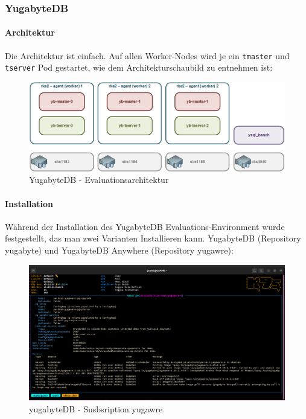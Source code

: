 
\clearpage
\begin{flushleft}
    \subsubsection{YugabyteDB}
    \paragraph{Architektur}
    Die Architektur ist einfach.
    Auf allen Worker-Nodes wird je ein \texttt{tmaster} und \texttt{tserver} Pod gestartet,
    wie dem Architekturschaubild zu entnehmen ist:
    \begin{figure}[H]
        \centering
        \includegraphics[width=0.8\linewidth]{source/implementation/evaluation/postgresql_ha_solutions/yugabytedb/yugabytedb-evaluation-architecture}
        \caption{YugabyteDB - Evaluationsarchitektur}
        \label{fig:yugabytedb-evaluation-architecture}
    \end{figure}
    \paragraph{Installation}
    Während der Installation des YugabyteDB Evaluations-Environment wurde festgestellt, das man zwei Varianten Installieren kann.
    YugabyteDB (Repository yugabyte) und YugabyteDB Anywhere (Repository yugawre):
    \begin{figure}[H]
        \centering
        \includegraphics[width=1\linewidth]{source/implementation/evaluation/platforms/yugabytedb_pod_installation_subscription_interrup}
        \caption{yugabyteDB - Susbsription yugawre}
        \label{fig:yugabytedb_pod_installation_subscription_interrup}
    \end{figure}
\end{flushleft}
